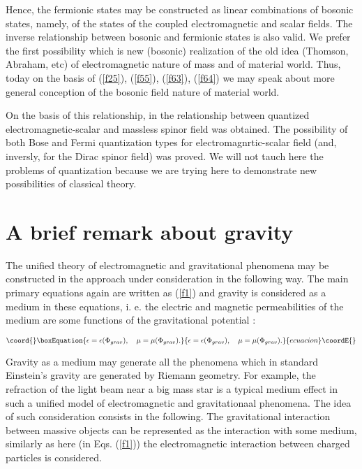 \documentclass[a4paper,12pt]{article}
\begin{document}
Hence, the fermionic states may be constructed as linear combinations of
bosonic states, namely, of the states of the coupled electromagnetic \coordHE{} and
scalar \coordHE{} fields. The inverse relationship between
bosonic and fermionic states is also valid. We prefer the first possibility
which is new (bosonic) realization of the old idea (Thomson, Abraham, etc)
of electromagnetic nature of mass and of material world. Thus, today on the
basis of (\ref{f25}), (\ref{f55}), (\ref{f63}), (\ref{f64}) we may speak
about more general conception of the bosonic field nature of material world.

On the basis of this relationship, in \cite{S2} the relationship between
quantized electromagnetic-scalar and massless spinor field was obtained. The
possibility of both Bose and Fermi quantization types for
electromagnrtic-scalar field (and, inversly, for the Dirac spinor field) was
proved. We will not tauch here the problems of quantization because we are
trying here to demonstrate new possibilities of classical theory.

\section{A brief remark about gravity}

The unified theory of electromagnetic and gravitational phenomena may be
constructed in the approach under consideration in the following way. The
main primary equations again are written as (\ref{f1}) and gravity is
considered as a medium in these equations, i. e. the electric \myHighlight{$\epsilon $}\coordHE{}
and magnetic \myHighlight{$\mu $}\coordHE{} permeabilities of the medium are some functions of the
gravitational potential \coordHE{}:

\begin{equation}\coord{}\boxEquation{
\epsilon =\epsilon (\Phi _{grav}),\quad \mu =\mu (\Phi _{grav}).  \label{f65}
}{
\epsilon =\epsilon (\Phi _{grav}),\quad \mu =\mu (\Phi _{grav}).  }{ecuacion}\coordE{}\end{equation}

Gravity as a medium may generate all the phenomena which in standard
Einstein's gravity are generated by Riemann geometry. For example, the
refraction of the light beam near a big mass star is a typical medium effect
in such a unified model of electromagnetic and gravitationaal phenomena. The
idea of such consideration consists in the following. The gravitational
interaction between massive objects can be represented as the interaction
with some medium, similarly as here (in Eqs. (\ref{f1})) the electromagnetic
interaction between charged particles is considered.
\end{document}
